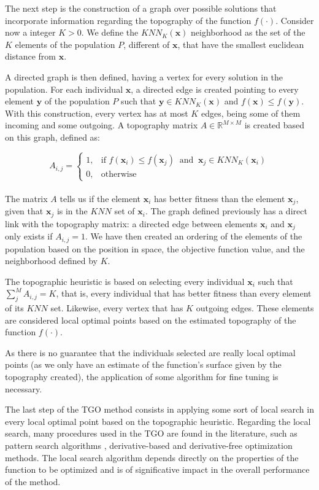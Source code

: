 The next step is the construction of a graph over possible solutions that incorporate information regarding the topography of the function $f(\cdot)$. Consider now a integer $K > 0$. We define the $KNN_K(\bm{x})$ neighborhood as the set of the $K$ elements of the population $P$, different of $\bm{x}$, that have the smallest euclidean distance from $\bm{x}$.

A directed graph is then defined, having a vertex for every solution in the population. For each individual $\bm{x}$, a directed edge is created pointing to every element $\bm{y}$ of the population $P$ such that $\bm{y} \in KNN_K(\bm{x})$ and $f(\bm{x}) \leq f(\bm{y})$. With this construction, every vertex has at most $K$ edges, being some of them incoming and some outgoing. A topography matrix $A \in \mathbb{R}^{M \times M}$ is created based on this graph, defined as:


\[
    A_{i, j} = 
\begin{cases}
    1,& \text{if } f(\bm{x}_i) \leq f(\bm{x}_j) \ \text{ and } \ \bm{x}_j \in KNN_K(\bm{x}_i) \\
    0,& \text{otherwise}
\end{cases}
\]
\\[-1.5em]


The matrix $A$ tells us if the element $\bm{x}_i$ has better fitness than the element $\bm{x}_j$, given that $\bm{x}_j$ is in the $KNN$ set of $\bm{x}_i$. The graph defined previously has a direct link with the topography matrix: a directed edge between elements $\bm{x}_i$ and $\bm{x}_j$ only exists if $A_{i, j} = 1$. We have then created an ordering of the elements of the population based on the position in space, the objective function value, and the neighborhood defined by $K$.

The topographic heuristic is based on selecting every individual $\bm{x}_i$ such that \allowbreak $\sum_j^M A_{i, j} = K$, that is, every individual that has better fitness than every element of its $KNN$ set. Likewise, every vertex that has $K$ outgoing edges. These elements are considered local optimal points based on the estimated topography of the function $f(\cdot)$.

As there is no guarantee that the individuals selected are really local optimal points (as we only have an estimate of the function's surface given by the topography created), the application of some algorithm for fine tuning is necessary.

The last step of the TGO method consists in applying some sort of local search in every local optimal point based on the topographic heuristic. Regarding the local search, many procedures used in the TGO are found in the literature, such as pattern search algorithms \citep{ITGO2}, derivative-based \citep{ITGO3} and derivative-free \citep{ITGO4} optimization methods. The local search algorithm depends directly on the properties of the function to be optimized and is of significative impact in the overall performance of the method.

